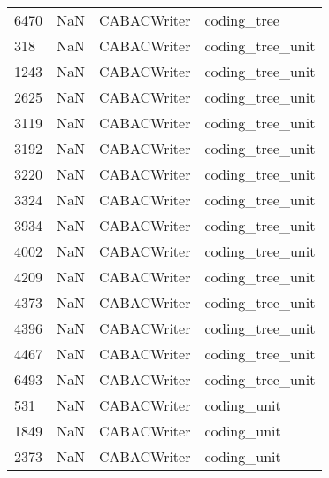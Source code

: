 \begin{tabular}{llll}
6470 &                   NaN &                CABACWriter &                               coding\_tree \\
318  &                   NaN &                CABACWriter &                          coding\_tree\_unit \\
1243 &                   NaN &                CABACWriter &                          coding\_tree\_unit \\
2625 &                   NaN &                CABACWriter &                          coding\_tree\_unit \\
3119 &                   NaN &                CABACWriter &                          coding\_tree\_unit \\
3192 &                   NaN &                CABACWriter &                          coding\_tree\_unit \\
3220 &                   NaN &                CABACWriter &                          coding\_tree\_unit \\
3324 &                   NaN &                CABACWriter &                          coding\_tree\_unit \\
3934 &                   NaN &                CABACWriter &                          coding\_tree\_unit \\
4002 &                   NaN &                CABACWriter &                          coding\_tree\_unit \\
4209 &                   NaN &                CABACWriter &                          coding\_tree\_unit \\
4373 &                   NaN &                CABACWriter &                          coding\_tree\_unit \\
4396 &                   NaN &                CABACWriter &                          coding\_tree\_unit \\
4467 &                   NaN &                CABACWriter &                          coding\_tree\_unit \\
6493 &                   NaN &                CABACWriter &                          coding\_tree\_unit \\
531  &                   NaN &                CABACWriter &                               coding\_unit \\
1849 &                   NaN &                CABACWriter &                               coding\_unit \\
2373 &                   NaN &                CABACWriter &                               coding\_unit \\

\end{tabular}
